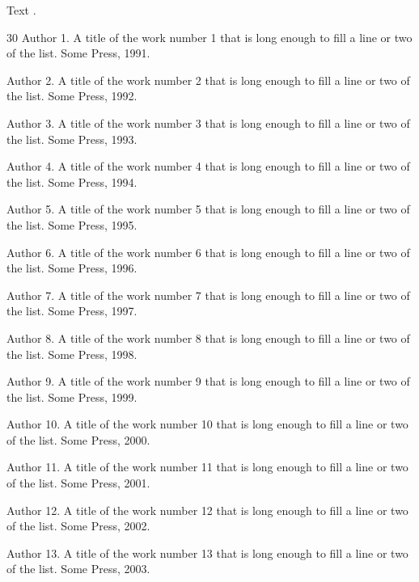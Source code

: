 \documentclass{article}
\begin{document}
Text \citep{k1}.

\begin{thebibliography}{30}
Author 1.
\newblock A title of the work number 1 that is long enough to fill a line or two of the list.
\newblock Some Press, 1991.

Author 2.
\newblock A title of the work number 2 that is long enough to fill a line or two of the list.
\newblock Some Press, 1992.

Author 3.
\newblock A title of the work number 3 that is long enough to fill a line or two of the list.
\newblock Some Press, 1993.

Author 4.
\newblock A title of the work number 4 that is long enough to fill a line or two of the list.
\newblock Some Press, 1994.

Author 5.
\newblock A title of the work number 5 that is long enough to fill a line or two of the list.
\newblock Some Press, 1995.

Author 6.
\newblock A title of the work number 6 that is long enough to fill a line or two of the list.
\newblock Some Press, 1996.

Author 7.
\newblock A title of the work number 7 that is long enough to fill a line or two of the list.
\newblock Some Press, 1997.

Author 8.
\newblock A title of the work number 8 that is long enough to fill a line or two of the list.
\newblock Some Press, 1998.

Author 9.
\newblock A title of the work number 9 that is long enough to fill a line or two of the list.
\newblock Some Press, 1999.

Author 10.
\newblock A title of the work number 10 that is long enough to fill a line or two of the list.
\newblock Some Press, 2000.

Author 11.
\newblock A title of the work number 11 that is long enough to fill a line or two of the list.
\newblock Some Press, 2001.

Author 12.
\newblock A title of the work number 12 that is long enough to fill a line or two of the list.
\newblock Some Press, 2002.

Author 13.
\newblock A title of the work number 13 that is long enough to fill a line or two of the list.
\newblock Some Press, 2003.


\end{thebibliography}
\end{document}
